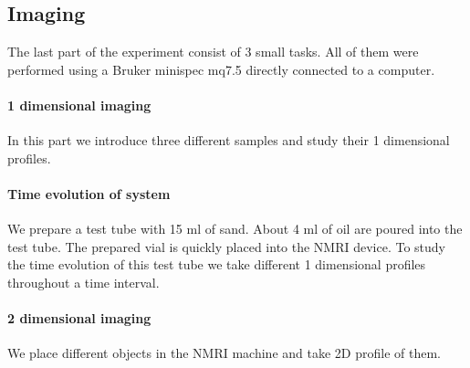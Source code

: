 \subsection{Imaging}
The last part of the experiment consist of 3 small tasks. All of them were performed using a Bruker minispec mq7.5 directly connected to a computer.
\paragraph{1 dimensional imaging}
In this part we introduce three different samples and study their 1 dimensional profiles. 
\paragraph{Time evolution of system}
We prepare a test tube with 15 ml of sand. About 4 ml of oil are poured into the test tube. The prepared vial is quickly placed into the NMRI device. To study the time evolution of this test tube we take different 1 dimensional profiles throughout a time interval. 
\paragraph{2 dimensional imaging}
We place different objects in the NMRI machine and take 2D profile of them. 

